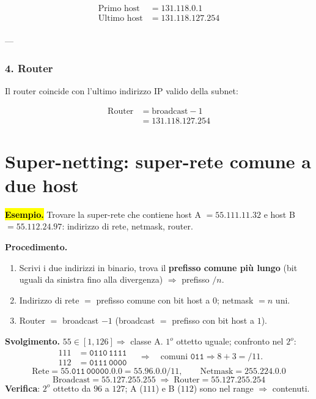 \documentclass[11pt,a4paper]{report}
\begin{document}
\begin{align*}
\text{Primo host} &= 131.118.0.1 \\
\text{Ultimo host} &= 131.118.127.254 \\
\end{align*}

---

\subsubsection*{4. Router}

Il router coincide con l'ultimo indirizzo IP valido della subnet:

\begin{align*}
\text{Router} &= \text{broadcast} - 1 \\
&= 131.118.127.254
\end{align*}

\section{Super-netting: super-rete comune a due host}
\label{teoria:supernet}

\hl{\textbf{Esempio.}} Trovare la super-rete che contiene host A $=
55.111.11.32$ e host B $= 55.112.24.97$: indirizzo di rete, netmask, router.

\textbf{Procedimento.}
\begin{enumerate}[noitemsep]
\item Scrivi i due indirizzi in binario, trova il \textbf{prefisso comune più
lungo} (bit uguali da sinistra fino alla divergenza) $\Rightarrow$ prefisso $/n$.
\item Indirizzo di rete $=$ prefisso comune con bit host a $0$; netmask $= n$ uni.
\item Router $=$ broadcast $-1$ (broadcast $=$ prefisso con bit host a $1$).
\end{enumerate}

\textbf{Svolgimento.} $55 \in [1,126] \Rightarrow$ classe A. $1^o$ ottetto uguale;
confronto nel $2^o$:
\[
\begin{aligned}
111 &= \mathtt{0110\,1111}\\
112 &= \mathtt{0111\,0000}
\end{aligned}
\quad\Rightarrow\quad \text{comuni } \mathtt{011} \Rightarrow 8+3 = /11.
\]
\[
\text{Rete} = 55.\mathtt{011\,00000}.0.0 = \boxed{55.96.0.0/11},
\qquad \text{Netmask} = 255.224.0.0
\]
\[
\text{Broadcast} = 55.127.255.255 \;\Rightarrow\;
\text{Router} = \boxed{55.127.255.254}
\]
\textbf{Verifica}: $2^o$ ottetto da $96$ a $127$; A ($111$) e B ($112$) sono nel
range $\Rightarrow$ contenuti.
\end{document}
